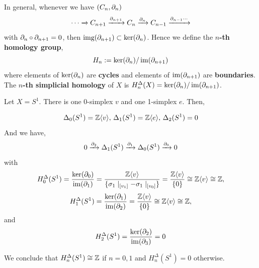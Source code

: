 \documentclass[12pt]{amsart}
\begin{document}
\begin{definition}
    In general, whenever we have $(C_n, \partial_n)$
    \[\cdots \xrightarrow{} C_{n+1} \xrightarrow{\partial_{n+1}} C_n \xrightarrow{\partial_n} C_{n-1} \xrightarrow{\partial_{n-1} \cdots }\] 
    with $\partial_n \circ \partial_{n+1} = 0$, then $\operatorname{img}(\partial_{n+1}) \subset \ker(\partial_n)$. Hence we define the \textbf{$n$-th homology group}, 
    \[H_n := \ker(\partial_n) / \operatorname{im}(\partial_{n+1})\]
    where elements of $\ker(\partial_n)$ are \textbf{cycles} and elements of $\operatorname{im}(\partial_{n+1})$ are \textbf{boundaries}. The \textbf{$n$-th simplicial homology} of $X$ is $H_n^\Delta(X) = \ker(\partial_n) / \operatorname{im}(\partial_{n+1})$.
\end{definition}

\begin{example}
    Let $X = S^1$. There is one 0-simplex $v$ and one 1-simplex $e$. Then, 

    \[\Delta_0(S^1) = \mathbb Z \langle v \rangle, \, \Delta_1(S^1) = \mathbb Z \langle e \rangle, \, \Delta_2(S^1) = 0\]
    And we have, 
    \[0 \xrightarrow{\partial_2} \Delta_1(S^1) \xrightarrow{\partial_1} \Delta_0 (S^1) \xrightarrow{\partial_0} 0\]
    with 
    \[H_0^\Delta(S^1) = \frac{\ker(\partial_0)}{\operatorname{im}(\partial_1)} = \frac{\mathbb Z \langle v \rangle}{ \{\sigma_1 \mid_{[v_1] }- \sigma_1 \mid_{[v_0]}\}} = \frac{\mathbb Z\langle v \rangle}{\{0\}} \cong \mathbb Z\langle v \rangle \cong \mathbb Z,\]
    \[H_1^\Delta(S^1) = \frac{\ker(\partial_1)}{\operatorname{im}(\partial_2)} = \frac{\mathbb Z \langle v \rangle}{ \{0\}} \cong \mathbb Z\langle v \rangle \cong \mathbb Z,\]
    and
    \[H_2^\Delta(S^1) = \frac{\ker(\partial_2)}{\operatorname{im}(\partial_3)} = { 0}\]

    We conclude that $H_n^\Delta(S^1) \cong \mathbb Z$ if $n = 0, 1$ and  $H_n^\Delta(S^1) = 0$ otherwise. 
\end{example}
\end{document}
